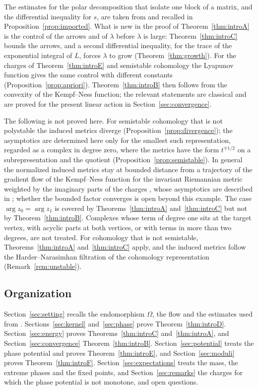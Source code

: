The estimates for the polar decomposition that isolate one block of a
matrix, and the differential inequality for $s$, are taken from \cite{wue26}
and recalled in Proposition~\ref{prop:imported}. What is new in the proof of
Theorem~\ref{thm:introA} is the control of the arrows and of $\lambda$ before
$\lambda$ is large: Theorem~\ref{thm:introC} bounds the arrows, and a second
differential inequality, for the trace of the exponential integral of $L$,
forces $\lambda$ to grow (Theorem~\ref{thm:growth}). For the charges of
Theorem~\ref{thm:introE} and semistable cohomology the Lyapunov function
gives the same control with different constants
(Proposition~\ref{prop:apriori}). Theorem~\ref{thm:introB} then follows from
the convexity of the Kempf--Ness function; the relevant statements are
classical \cite{kn79,grs21} and are proved for the present linear action in
Section~\ref{sec:convergence}.

The following is not proved here. For semistable cohomology that is not
polystable the induced metrics diverge
(Proposition~\ref{prop:divergence}); the asymptotics are determined here
only for the smallest such representation, regarded as a complex in degree
zero, where the metrics have the form $t^{\mp1/2}$ on a subrepresentation
and the quotient (Proposition~\ref{prop:semistable}). In general the
normalized induced metrics stay at bounded distance from a trajectory of the
gradient flow of the Kempf--Ness function for the invariant Riemannian
metric weighted by the imaginary parts of the charges
\cite[Theorem~6.3 and Corollary~6.5]{wue26b}, whose asymptotics are
described in \cite{hkkp23}; whether the bounded factor converges is open
beyond this example. The case
$\arg z_0=\arg z_1$ is covered by Theorems~\ref{thm:introA}
and~\ref{thm:introC} but not by Theorem~\ref{thm:introB}. Complexes whose
term of degree one sits at the target vertex, with acyclic parts at both
vertices, or with terms in more than two degrees, are not treated. For
cohomology that is not semistable, Theorems~\ref{thm:introA}
and~\ref{thm:introC} apply, and the induced metrics follow the
Harder--Narasimhan filtration of the cohomology representation
\cite[Theorem~6.11]{wue26b} (Remark~\ref{rem:unstable}).

\subsection{Organization}
Section~\ref{sec:setting} recalls the endomorphism $\Omega$, the flow and the
estimates
used from \cite{wue26}. Sections~\ref{sec:kernel} and~\ref{sec:phase} prove
Theorem~\ref{thm:introD}. Section~\ref{sec:energy} proves
Theorems~\ref{thm:introC} and~\ref{thm:introA}, and
Section~\ref{sec:convergence} Theorem~\ref{thm:introB}.
Section~\ref{sec:potential} treats the phase potential and proves
Theorem~\ref{thm:introE}, and Section~\ref{sec:moduli} proves
Theorem~\ref{thm:introF}. Section~\ref{sec:expectations} treats the mass, the
extreme phases and the fixed points, and Section~\ref{sec:remarks} the charges
for which the phase potential is not monotone, and open questions.
